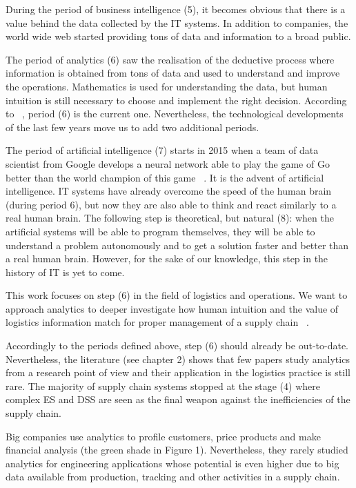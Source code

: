 During the period of business intelligence (5), it becomes obvious that there is a value behind the data collected by the IT systems. In addition to companies, the world wide web started providing tons of data and information to a broad public.\par

The period of analytics (6) saw the realisation of the deductive process where information is obtained from tons of data and used to understand and improve the operations. Mathematics is used for understanding the data, but human intuition is still necessary to choose and implement the right decision. According to ~\cite{Mortenson2015}, period (6) is the current one. Nevertheless, the technological developments of the last few years move us to add two additional periods.\par

The period of artificial intelligence (7) starts in 2015 when a team of data scientist from Google develops a neural network able to play the game of Go better than the world champion of this game ~\cite{Silver2016}. It is the advent of artificial intelligence. IT systems have already overcome the speed of the human brain (during period 6), but now they are also able to think and react similarly to a real human brain. The following step is theoretical, but natural (8): when the artificial systems will be able to program themselves, they will be able to understand a problem autonomously and to get a solution faster and better than a real human brain. However, for the sake of our knowledge, this step in the history of IT is yet to come.\par

This work focuses on step (6) in the field of logistics and operations. We want to approach analytics to deeper investigate how human intuition and the value of logistics information match for proper management of a supply chain ~\cite{Arvan2019}.\par

Accordingly to the periods defined above, step (6) should already be out-to-date. Nevertheless, the literature (see chapter 2) shows that few papers study analytics from a research point of view and their application in the logistics practice is still rare. The majority of supply chain systems stopped at the stage (4) where complex ES and DSS are seen as the final weapon against the inefficiencies of the supply chain.\par

Big companies use analytics to profile customers, price products and make financial analysis (the green shade in Figure 1). Nevertheless, they rarely studied analytics for engineering applications whose potential is even higher due to big data available from production, tracking and other activities in a supply chain. 

